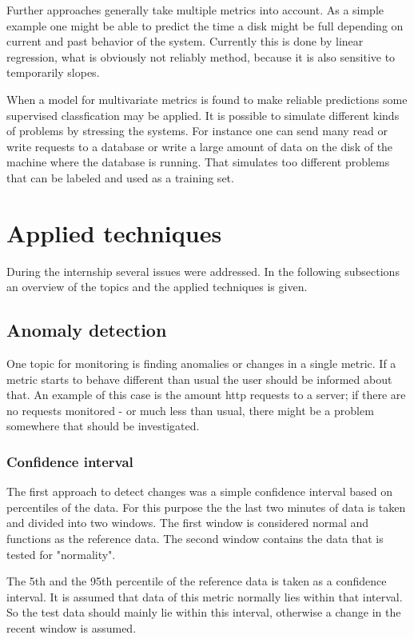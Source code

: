 \documentclass[]{article}
\begin{document}
Further approaches generally take multiple metrics into account.
As a simple example one might be able to predict the time a disk might be full depending on current and past behavior of the system. 
Currently this is done by linear regression, what is obviously not reliably method, because it is also sensitive to temporarily slopes.

When a model for multivariate metrics is found to make reliable predictions some supervised classfication may be applied.
It is possible to simulate different kinds of problems by stressing the systems.
For instance one can send many read or write requests to a database or write a large amount of data on the disk of the machine where the database is running.
That simulates too different problems that can be labeled and used as a training set.

\section{Applied techniques}
During the internship several issues were addressed.
In the following subsections an overview of the topics and the applied techniques is given.

\subsection{Anomaly detection}
One topic for monitoring is finding anomalies or changes in a single metric.
If a metric starts to behave different than usual the user should be informed about that.
An example of this case is the amount http requests to a server; if there are no requests monitored - or much less than usual, there might be a problem somewhere that should be investigated. 

\subsubsection{Confidence interval}
The first approach to detect changes was a simple confidence interval based on percentiles of the data.
For this purpose the the last two minutes of data is taken and divided into two windows.
The first window is considered normal and functions as the reference data.
The second window contains the data that is tested for "normality".

The 5th and the 95th percentile of the reference data is taken as a confidence interval.
It is assumed that data of this metric normally lies within that interval.
So the test data should mainly lie within this interval, otherwise a change in the recent window is assumed.
\end{document}
